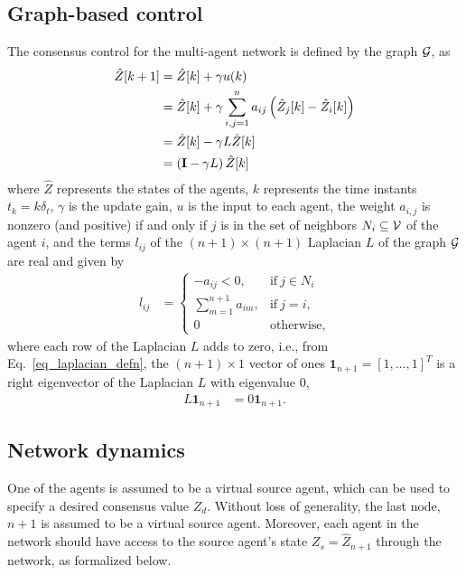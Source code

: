 \documentclass[conference]{IEEEtran}
\begin{document}
\subsection{Graph-based control}
The consensus control for the multi-agent network is defined 
by the graph ${\cal{G}}$, as 
\begin{align}
\hat{Z}[k+1] & =  \hat{Z}[k] +\gamma  u(k) \nonumber \\
&  = \hat{Z}[k] +  \gamma  \sum_{i,j =1}^{n}  a_{ij}\left( \hat{Z}_j[k] - \hat{Z}_i[k] \right) \nonumber \\
& = \hat{Z}[k] -  \gamma  L \hat{Z}[k]  \nonumber \\
& = \left( {\bf{I}} - \gamma  L  \right) \hat{Z}[k] 
\label{system_eq}
\end{align}
where $\hat{Z}$ represents the states of the agents, 
$k$ represents the time instants $t_k = k \delta_t$, 
 $\gamma $ is the update gain, 
$u$ is the input to each agent, the weight $a_{i,j}$ is nonzero (and positive)
if and only if $j$ is in the set of neighbors $N_i  \subseteq {\cal{V}} $  of the agent $i$, 
and the terms
 $l_{ij}$ of the $(n+1)\times(n+1)$ Laplacian $L$  of the graph ${\cal{G}}$ are real and given by 
\begin{eqnarray}
\label{eq_laplacian_defn}
l_{ij} & =   \left\{ 
\begin{array}{ll}
-a_{ij} < 0, 	& {\mbox{if}} ~ j \in N_i \\
\sum_{m=1}^{n+1} a_{im}, & {\mbox{if}} ~ j = i,  \\
0 & {\mbox{otherwise,}}
\end{array}  
\right.
\end{eqnarray}
where 
each row of the Laplacian $L$ adds to zero, i.e., from Eq.~\eqref{eq_laplacian_defn}, 
the $(n+1) \times 1$ vector of ones  ${\textbf{1}}_{n+1}= [1, \ldots, 1]^T$  is a right eigenvector of the Laplacian $L$ with eigenvalue $0$,   
\begin{eqnarray}
\label{eq_first_lambda_eigenvector}
L{\textbf{1}}_{n+1} & = 0  {\textbf{1}}_{n+1} .
\end{eqnarray}



\subsection{Network dynamics}
One of the agents is assumed to be a virtual source agent, which can be 
used to specify a desired consensus value $Z_d$.  Without loss of 
generality, the last node, $n+1$ is assumed to be a virtual source agent. Moreover, each 
agent in the network should have access to the source agent's state ${Z}_s = \hat{Z}_{n+1}$  through the network, as formalized below. 
\end{document}
